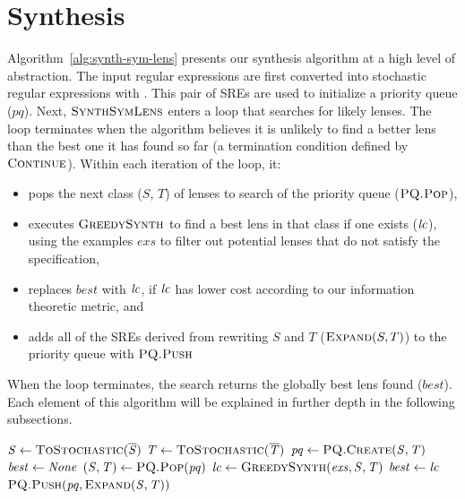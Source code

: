 \documentclass[acmsmall,screen,anonymous]{acmart}
\begin{document}
\section{Synthesis}
\label{sec:synthesis}
Algorithm~\ref{alg:synth-sym-lens} presents our synthesis algorithm at a high
level of abstraction. The input regular expressions are first converted into
stochastic regular expressions with \ToStochastic.  
This pair of SREs are used to initialize a priority queue ($pq$).
Next, $\PCF{SynthSymLens}$
enters a loop that searches for likely lenses. The loop terminates when the
algorithm believes it is unlikely to find a better lens than the best one it has
found so far (a termination condition defined by $\PCF{\Continue}$). Within each
iteration of the loop, it:
\begin{itemize}
\item pops the next class ($S$, $T$) of lenses to
search of the priority queue ($\PCF{\PQ.Pop}$),
\item executes $\GreedySynth$ to find a best lens in that class if
one exists ($\mathit{lc}$),
using the examples $exs$ to filter out potential lenses that do not satisfy
the specification,
\item replaces $best$ with $\mathit{lc}$, if $\mathit{lc}$ has lower cost according
to our information theoretic metric, and
\item adds all of the SREs derived from rewriting $S$ and $T$ ($\Expand(S,T)$)
  to the priority queue with $\PCF{\PQ.Push}$
\end{itemize}
When the loop terminates, the search returns the globally best lens found
($best$).  Each element of this algorithm will be explained in
further depth in the following subsections.

\begin{algorithm}
  \caption{\SynthSymLens}
  \label{alg:synth-sym-lens}
  \begin{algorithmic}[1]
    \State $\Regex \gets \Call{\ToStochastic}{\BRegex}$
    \State $\RegexAlt \gets \Call{\ToStochastic}{\BRegexAlt}$
    \State $\RXSearchState \gets \Call{\PQ.Create}{\Regex,\RegexAlt}$
    \State $\mathit{best} \gets \mathit{None}$
    \While{$\Call{\Continue}{\RXSearchState,\Best}$}
    \State $(\Regex,\RegexAlt) \gets \Call{\PQ.Pop}{\RXSearchState}$
    \State $\LC \gets \Call{\GreedySynth}{\Examples,\Regex,\RegexAlt}$
    \State $\mathit{best} \gets \mathit{lc}$
    \EndIf
    \State $\Call{\PQ.Push}{\RXSearchState,\Expand(\Regex,\RegexAlt)}$
    \EndWhile
    \State {}
    \EndFunction
  \end{algorithmic}
\end{algorithm}
\end{document}

